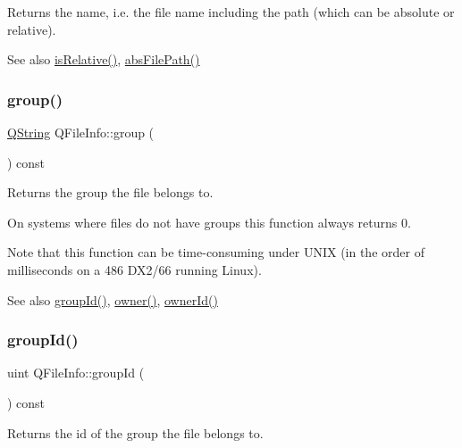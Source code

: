 Returns the name, i.\+e. the file name including the path (which can be absolute or relative).

\begin{DoxySeeAlso}{See also}
\mbox{\hyperlink{class_q_file_info_ae1b2d0ad6ca05510092d0182e276a5d0}{is\+Relative()}}, \mbox{\hyperlink{class_q_file_info_a762ffb9217db04495831537e38db1bde}{abs\+File\+Path()}} 
\end{DoxySeeAlso}
\mbox{\label{class_q_file_info_afb46f8fb3080ab0b32b4236436624ea3}} 
\subsubsection{\texorpdfstring{group()}{group()}}
{\footnotesize\ttfamily \mbox{\hyperlink{class_q_string}{Q\+String}} Q\+File\+Info\+::group (\begin{DoxyParamCaption}{ }\end{DoxyParamCaption}) const}

Returns the group the file belongs to.

On systems where files do not have groups this function always returns 0.

Note that this function can be time-\/consuming under U\+N\+IX (in the order of milliseconds on a 486 D\+X2/66 running Linux).

\begin{DoxySeeAlso}{See also}
\mbox{\hyperlink{class_q_file_info_a40e9808fbf54b07717d2f3a4307da74f}{group\+Id()}}, \mbox{\hyperlink{class_q_file_info_a96831b45809e905dc14e5c065bfa8421}{owner()}}, \mbox{\hyperlink{class_q_file_info_ab963b7409fa73f7cc31aaff794015c4f}{owner\+Id()}} 
\end{DoxySeeAlso}
\mbox{\label{class_q_file_info_a40e9808fbf54b07717d2f3a4307da74f}} 
\subsubsection{\texorpdfstring{groupId()}{groupId()}}
{\footnotesize\ttfamily uint Q\+File\+Info\+::group\+Id (\begin{DoxyParamCaption}{ }\end{DoxyParamCaption}) const}

Returns the id of the group the file belongs to.

